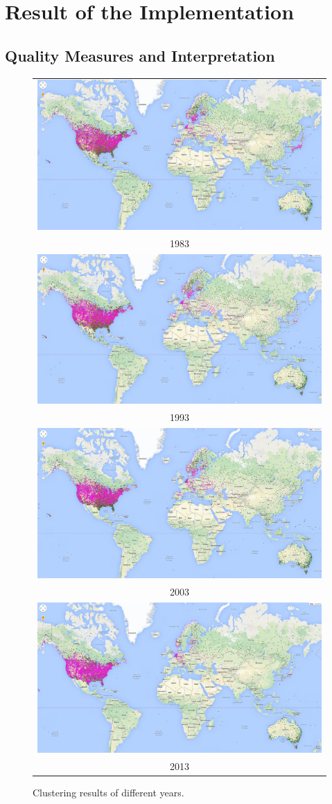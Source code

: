 \section{Result of the Implementation}
\subsection{Quality Measures and Interpretation}
\begin{figure}
    \centering
    \begin{tabular}{c}
        \includegraphics[width =.65\linewidth]{figure/1983.png}\\         1983 \\ 
        \includegraphics[width =.65\linewidth]{figure/1993.png} \\
        1993 \\
        \includegraphics[width =.65\linewidth]{figure/2003.png} \\         2003 \\ 
        \includegraphics[width =.65\linewidth]{figure/2013.png} \\
        2013\\
    \end{tabular}
    \caption{Clustering results of different years.}
    \label{fig:ClusteringFlow}
\end{figure}

